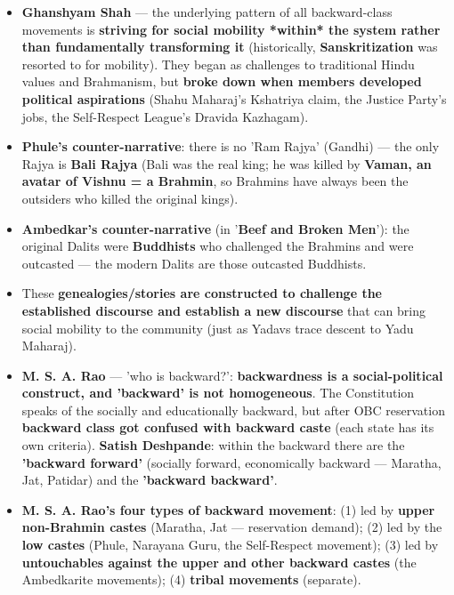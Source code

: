 \begin{KeyConcept}
\begin{itemize}
\item \textbf{Ghanshyam Shah} --- the underlying pattern of all backward-class movements is \textbf{striving for social mobility *within* the system rather than fundamentally transforming it} (historically, \textbf{Sanskritization} was resorted to for mobility). They began as challenges to traditional Hindu values and Brahmanism, but \textbf{broke down when members developed political aspirations} (Shahu Maharaj's Kshatriya claim, the Justice Party's jobs, the Self-Respect League's Dravida Kazhagam).
\item \textbf{Phule's counter-narrative}: there is no 'Ram Rajya' (Gandhi) --- the only Rajya is \textbf{Bali Rajya} (Bali was the real king; he was killed by \textbf{Vaman, an avatar of Vishnu = a Brahmin}, so Brahmins have always been the outsiders who killed the original kings).
\item \textbf{Ambedkar's counter-narrative} (in '\textbf{Beef and Broken Men}'): the original Dalits were \textbf{Buddhists} who challenged the Brahmins and were outcasted --- the modern Dalits are those outcasted Buddhists.
\item These \textbf{genealogies/stories are constructed to challenge the established discourse and establish a new discourse} that can bring social mobility to the community (just as Yadavs trace descent to Yadu Maharaj).
\item \textbf{M. S. A. Rao} --- 'who is backward?': \textbf{backwardness is a social-political construct, and 'backward' is not homogeneous}. The Constitution speaks of the socially and educationally backward, but after OBC reservation \textbf{backward class got confused with backward caste} (each state has its own criteria). \textbf{Satish Deshpande}: within the backward there are the \textbf{'backward forward'} (socially forward, economically backward --- Maratha, Jat, Patidar) and the \textbf{'backward backward'}.
\item \textbf{M. S. A. Rao's four types of backward movement}: (1) led by \textbf{upper non-Brahmin castes} (Maratha, Jat --- reservation demand); (2) led by the \textbf{low castes} (Phule, Narayana Guru, the Self-Respect movement); (3) led by \textbf{untouchables against the upper and other backward castes} (the Ambedkarite movements); (4) \textbf{tribal movements} (separate).
\end{itemize}
\end{KeyConcept}

